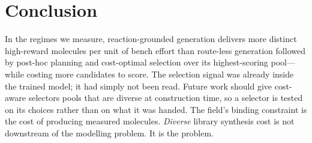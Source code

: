 \documentclass{article}
\newcommand{\checkval}[1]{\textcolor{blue}{#1}}
\begin{document}


\section{Conclusion}

In the regimes we measure, reaction-grounded generation delivers more distinct high-reward molecules per unit of bench effort than route-less generation followed by post-hoc planning and cost-optimal selection over its highest-scoring pool---while costing more candidates to score. The selection signal was already inside the trained model; it had simply not been read. Future work should give cost-aware selectors pools that are diverse at construction time, so a selector is tested on its choices rather than on what it was handed. The field's binding constraint is the cost of producing measured molecules. \emph{Diverse} library synthesis cost is not downstream of the modelling problem. It is the problem.
\end{document}

